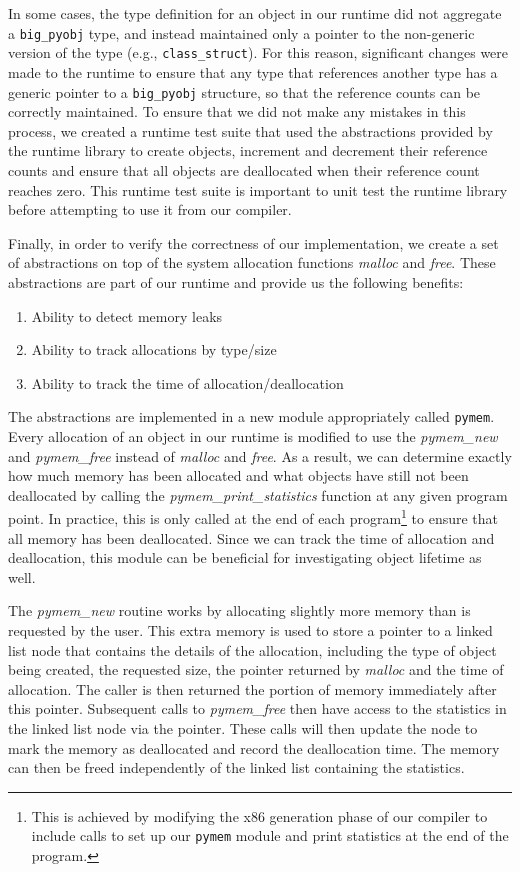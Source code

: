 \documentclass{sigplanconf}
\newcommand{\afunction}[1]{\textit{#1}}
\newcommand{\atype}[1]{\texttt{#1}}
\begin{document}
In some cases, the type definition for an object in our runtime did not aggregate a \atype{big\_pyobj} type, and instead maintained only a pointer to the non-generic version of the type (e.g., \atype{class\_struct}).  For this reason, significant changes were made to the runtime to ensure that any type that references another type has a generic pointer to a \atype{big\_pyobj} structure, so that the reference counts can be correctly maintained.  To ensure that we did not make any mistakes in this process, we created a runtime test suite that used the abstractions provided by the runtime library to create objects, increment and decrement their reference counts and ensure that all objects are deallocated when their reference count reaches zero.  This runtime test suite is important to unit test the runtime library before attempting to use it from our compiler.

Finally, in order to verify the correctness of our implementation, we create a set of abstractions on top of the system allocation functions \afunction{malloc} and \afunction{free}.  These abstractions are part of our runtime and provide us the following benefits: 

\begin{enumerate}
\item Ability to detect memory leaks
\item Ability to track allocations by type/size
\item Ability to track the time of allocation/deallocation
\end{enumerate}

The abstractions are implemented in a new module appropriately called \texttt{pymem}.  Every allocation of an object in our runtime is modified to use the \afunction{pymem\_new} and \afunction{pymem\_free} instead of \afunction{malloc} and \afunction{free}. As a result, we can determine exactly how much memory has been allocated and what objects have still not been deallocated by calling the \afunction{pymem\_print\_statistics} function at any given program point.  In practice, this is only called at the end of each program\footnote{This is achieved by modifying the x86 generation phase of our compiler to include calls to set up our \texttt{pymem} module and print statistics at the end of the program. } to ensure that all memory has been deallocated.  Since we can track the time of allocation and deallocation, this module can be beneficial for investigating object lifetime as well.  

The \afunction{pymem\_new} routine works by allocating slightly more memory than is requested by the user.  This extra memory is used to store a pointer to a linked list node that contains the details of the allocation, including the type of object being created, the requested size, the pointer returned by \afunction{malloc} and the time of allocation.  The caller is then returned the portion of memory immediately after this pointer.  Subsequent calls to \afunction{pymem\_free} then have access to the statistics in the linked list node via the pointer.  These calls will then update the node to mark the memory as deallocated and record the deallocation time.  The memory can then be freed independently of the linked list containing the statistics. 
\end{document}
